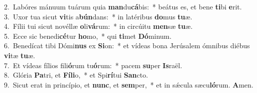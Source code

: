 {2.~}Labóres mánuum tuárum quia \textbf{man}du\textbf{cá}bis:~* beátus es, et bene \textbf{ti}bi \textbf{e}rit.\\
{3.~}Uxor tua sicut \textbf{vi}tis a\textbf{bún}dans:~* in latéribus \textbf{do}mus \textbf{tu}æ.\\
{4.~}Fílii tui sicut novéllæ \textbf{o}li\textbf{vá}rum:~* in circúitu \textbf{men}sæ \textbf{tu}æ.\\
{5.~}Ecce sic benedi\textbf{cé}tur \textbf{ho}mo,~* qui \textbf{ti}met \textbf{Dó}minum.\\
{6.~}Benedícat tibi Dómi\textbf{nus} ex \textbf{Si}on:~* et vídeas bona Jerúsalem ómnibus diébus \textbf{vi}tæ \textbf{tu}æ.\\
{7.~}Et vídeas fílios fili\textbf{ó}rum tu\textbf{ó}rum:~* pacem \textbf{su}per \textbf{Is}raël.\\
{8.~}Glória \textbf{Pa}tri, et \textbf{Fí}\textbf{li}o,~* et Spi\textbf{rí}tui \textbf{San}cto.\\
{9.~}Sicut erat in princípio, et \textbf{nunc}, et \textbf{sem}per,~* et in sǽcula sæcu\textbf{ló}rum. \textbf{A}men.\\
